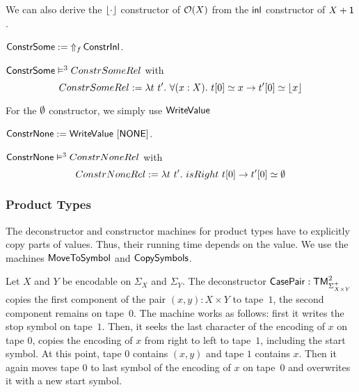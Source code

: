 We can also derive the $\Some{\cdot}$ constructor of $\Option(X)$ from the $\inl$ constructor of $X+\Unit$.
\begin{definition}
  \label{def:Constr_Some}
  $\MS{ConstrSome} := \LiftAlphabet{\MS{ConstrInl}}{f}$.
\end{definition}
\begin{lemma}
  \label{lem:Constr_Some_Sem}
  $\MS{ConstrSome} \RealiseIn{3} ConstrSomeRel$ with
  \[
    ConstrSomeRel := \lambda t~t'.~\forall(x:X).~t[0] \simeq x \rightarrow t'[0] \simeq \Some{x}
  \]
\end{lemma}
For the $\None$ constructor, we simply use $\MS{WriteValue}$
\begin{definition}
  \label{def:Constr_None}
  $\MS{ConstrNone} := \MS{WriteValue}~[\MS{NONE}]$.
\end{definition}
\begin{lemma}
  \label{lem:Constr_None_Sem}
  $\MS{ConstrNone} \RealiseIn{3} ConstrNoneRel$ with
  \[
    ConstrNoneRel := \lambda t~t'.~isRight~t[0] \rightarrow t'[0] \simeq \None
  \]
\end{lemma}


\subsubsection{Product Types}
\label{sec:CasePair}

The deconstructor and constructor machines for product types have to explicitly copy parts of values.  Thus, their running time depends on the value.  We
use the machines $\MS{MoveToSymbol}$ and $\MS{CopySymbols}$.

Let $X$ and $Y$ be encodable on $\Sigma_X$ and $\Sigma_Y$.  The deconstructor $\MS{CasePair} : \TM_{\Sigma_{X \times Y}^+}^2$ copies the first
component of the pair $(x,y):X \times Y$ to tape~$1$, the second component remains on tape~$0$.  The machine works as follows: first it writes the
stop symbol on tape~$1$.  Then, it seeks the last character of the encoding of $x$ on tape $0$, copies the encoding of $x$ from right to left to
tape~$1$, including the start symbol.  At this point, tape $0$ contains $(x,y)$ and tape $1$ contains $x$.  Then it again moves tape $0$ to last
symbol of the encoding of $x$ on tape~$0$ and overwrites it with a new start symbol.

